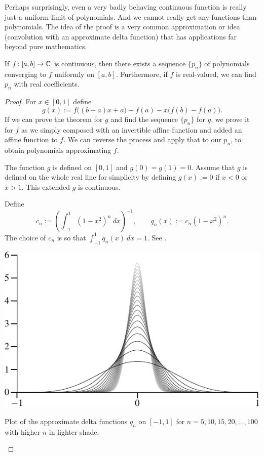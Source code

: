 Perhaps surprisingly, even a very badly behaving continuous function is really
just a uniform limit of polynomials.
And we cannot really get any 
functions than polynomials.
The idea of the proof is a very common approximation or  idea
(convolution with an approximate delta function) that has applications
far beyond pure mathematics.

\begin{thm}
If $f \colon [a,b] \to {\mathbb{C}}$ is continuous, then there exists a sequence $\{
p_n \}$ of polynomials converging to $f$ uniformly on $[a,b]$.
Furthermore, if $f$ is real-valued, we can find $p_n$ with real coefficients.
\end{thm}

\begin{proof}
For $x \in [0,1]$ define
\begin{equation*}
g(x) := f\bigl((b-a)x+a\bigr)-f(a) - x\bigl(f(b)-f(a)\bigr) .
\end{equation*}
If we can prove the theorem for $g$ and find the sequence $\{ p_n \}$ for $g$,
we prove it for $f$ as we simply
composed with an invertible affine function and added an affine
function to $f$.  We can reverse the process and apply that to our
$p_n$, to obtain polynomials approximating $f$.

The function $g$ is defined on $[0,1]$ and $g(0)=g(1)=0$.  Assume that
$g$ is defined on the whole real line for simplicity by defining
$g(x) := 0$ if $x < 0$ or $x > 1$.  This extended $g$ is continuous.

Define
\begin{equation*}
c_n := {\left( \int_{-1}^1 {(1-x^2)}^n~dx \right)}^{-1} ,
\qquad
q_n(x) := c_n (1-x^2)^n .
\end{equation*}
The choice of $c_n$ is
so that $\int_{-1}^1 q_n(x)~dx = 1$.
See .

\begin{myfigureht}
\includegraphics{figures/weierqn}
\caption{Plot of the approximate delta functions $q_n$ on $[-1,1]$ for
$n=5,10,15,20,\ldots,100$ with higher $n$ in lighter shade.\label{fig:weierqn}}
\end{myfigureht}


\end{proof}
